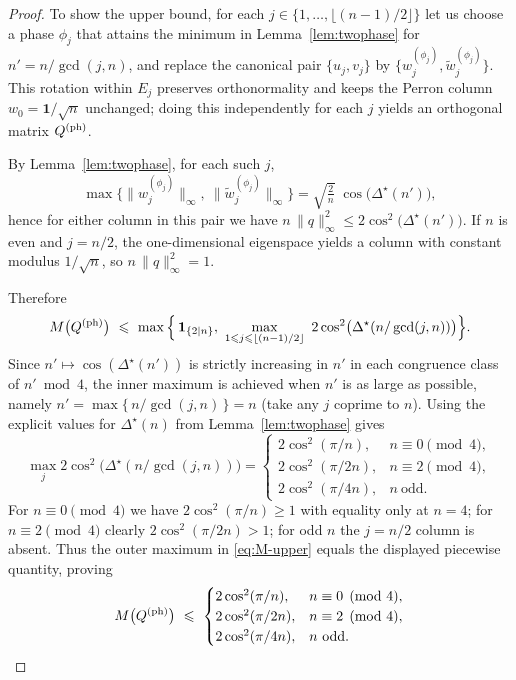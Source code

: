 \documentclass[12pt,fleqn]{amsart}
\renewcommand{\le}{\leqslant}
\renewcommand{\ge}{\geqslant}
\theoremstyle{remark}
\newcommand{\1}{\mathbf{1}}
\begin{document}
\begin{proof}
To show the upper bound, for each $j\in\{1,\dots,\lfloor (n-1)/2\rfloor\}$ let us choose a phase $\phi_j$ that attains the minimum in Lemma~\ref{lem:twophase} for $n'=n/\gcd(j,n)$, and replace the canonical pair $\{u_j,v_j\}$ by $\{w_j^{(\phi_j)},\tilde w_j^{(\phi_j)}\}$. This rotation within $E_j$ preserves orthonormality and keeps the Perron column $w_0=\1/\sqrt n$ unchanged; doing this independently for each $j$ yields an orthogonal matrix $Q^{\rm (ph)}$.

By Lemma~\ref{lem:twophase}, for each such $j$,
\[
\max\big\{\|w_j^{(\phi_j)}\|_\infty,\ \|\tilde w_j^{(\phi_j)}\|_\infty\big\}
=\sqrt{\tfrac{2}{n}}\;\cos\!\big(\Delta^\star(n')\big),
\]
hence for either column in this pair we have
\(
n\,\|q\|_\infty^2\le 2\cos^2\!\big(\Delta^\star(n')\big).
\)
If $n$ is even and $j=n/2$, the one-dimensional eigenspace yields a column with constant modulus $1/\sqrt n$, so $n\,\|q\|_\infty^2=1$.

Therefore
\begin{equation}\label{eq:M-upper}
M\big(Q^{\rm (ph)}\big)\ \le\ \max\Big\{\,\mathbf{1}_{\{2\mid n\}},\ \max_{1\le j\le \lfloor (n-1)/2\rfloor}\ 2\cos^2\!\big(\Delta^\star(n/\gcd(j,n))\big)\Big\}.
\end{equation}
Since $n'\mapsto \cos(\Delta^\star(n'))$ is strictly increasing in $n'$ in each congruence class of $n'\bmod 4$, the inner maximum is achieved when $n'$ is as large as possible, namely $n'=\max\{\,n/\gcd(j,n)\,\}=n$ (take any $j$ coprime to $n$). Using the explicit values for $\Delta^\star(n)$ from Lemma~\ref{lem:twophase} gives
\[
\max_{j}2\cos^2\!\big(\Delta^\star(n/\gcd(j,n))\big)
=
\begin{cases}
2\cos^2(\pi/n), & n\equiv 0\pmod 4,\\[1mm]
2\cos^2(\pi/2n), & n\equiv 2\pmod 4,\\[1mm]
2\cos^2(\pi/4n), & n\ \text{odd}.
\end{cases}
\]
For $n\equiv 0\pmod 4$ we have $2\cos^2(\pi/n)\ge 1$ with equality only at $n=4$; for $n\equiv 2\pmod 4$ clearly $2\cos^2(\pi/2n)>1$; for odd $n$ the $j=n/2$ column is absent. Thus the outer maximum in \eqref{eq:M-upper} equals the displayed piecewise quantity, proving
\[
M\big(Q^{\rm (ph)}\big)\ \le\
\begin{cases}
2\cos^2(\pi/n), & n\equiv 0\pmod 4,\\
2\cos^2(\pi/2n), & n\equiv 2\pmod 4,\\
2\cos^2(\pi/4n), & n\ \text{odd}.
\end{cases}
\]


\end{proof}
\end{document}
